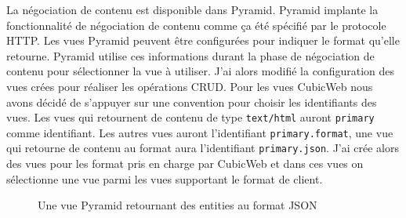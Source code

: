 La négociation de contenu est disponible dans Pyramid. Pyramid implante la fonctionnalité de négociation de contenu comme ça été spécifié par le protocole HTTP. Les vues Pyramid peuvent être configurées pour indiquer le format qu'elle retourne. Pyramid utilise ces informations durant la phase de négociation de contenu pour sélectionner la vue à utiliser. J'ai alors modifié la configuration des vues crées pour réaliser les opérations CRUD. Pour les vues CubicWeb nous avons décidé de s'appuyer sur une convention pour choisir les identifiants des vues. Les vues qui retournent de contenu de type \texttt{text/html} auront \texttt{primary} comme identifiant. Les autres vues auront l'identifiant \texttt{primary.format}, une vue qui retourne de contenu au format  aura l'identifiant \texttt{primary.json}. J'ai crée alors des vues pour les format pris en charge par CubicWeb et dans ces vues on sélectionne une vue parmi les vues supportant le format de client.   


\begin{figure}[htp]
    \centering
    \caption{Une vue Pyramid retournant des entities au format JSON}
    \label{fig:getjson}
\end{figure}
